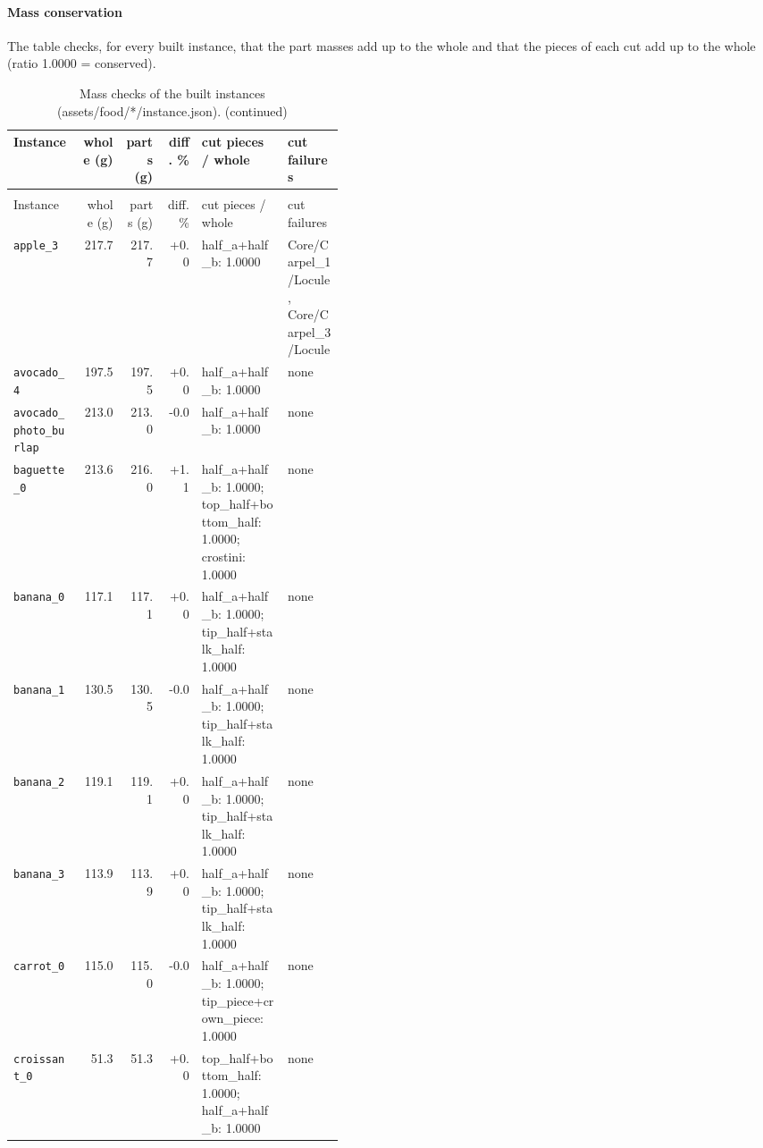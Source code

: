 \documentclass[10.5pt,a4paper]{article}
\begin{document}
\paragraph{Mass conservation} The table checks, for every built instance, that the part masses add up to the
whole and that the pieces of each cut add up to the whole (ratio 1.0000 = conserved).
{\scriptsize\begin{longtable}{@{}lrrrp{0.26\linewidth}p{0.17\linewidth}@{}}\caption{Mass checks of the built instances (assets/food/*/instance.json).\label{tab:mass}}\\\toprule Instance & whole (g) & parts (g) & diff. \% & cut pieces / whole & cut failures \\\midrule\endfirsthead
\caption[]{Mass checks of the built instances (assets/food/*/instance.json). (continued)}\\\toprule Instance & whole (g) & parts (g) & diff. \% & cut pieces / whole & cut failures \\\midrule\endhead
\texttt{apple\_\allowbreak{}3} & 217.7 & 217.7 & +0.0 & half\_a+half\_b: 1.0000 & Core/Carpel\_1/Locule, Core/Carpel\_3/Locule \\
\texttt{avocado\_\allowbreak{}4} & 197.5 & 197.5 & +0.0 & half\_a+half\_b: 1.0000 & none \\
\texttt{avocado\_\allowbreak{}photo\_\allowbreak{}burlap} & 213.0 & 213.0 & -0.0 & half\_a+half\_b: 1.0000 & none \\
\texttt{baguette\_\allowbreak{}0} & 213.6 & 216.0 & +1.1 & half\_a+half\_b: 1.0000; top\_half+bottom\_half: 1.0000; crostini: 1.0000 & none \\
\texttt{banana\_\allowbreak{}0} & 117.1 & 117.1 & +0.0 & half\_a+half\_b: 1.0000; tip\_half+stalk\_half: 1.0000 & none \\
\texttt{banana\_\allowbreak{}1} & 130.5 & 130.5 & -0.0 & half\_a+half\_b: 1.0000; tip\_half+stalk\_half: 1.0000 & none \\
\texttt{banana\_\allowbreak{}2} & 119.1 & 119.1 & +0.0 & half\_a+half\_b: 1.0000; tip\_half+stalk\_half: 1.0000 & none \\
\texttt{banana\_\allowbreak{}3} & 113.9 & 113.9 & +0.0 & half\_a+half\_b: 1.0000; tip\_half+stalk\_half: 1.0000 & none \\
\texttt{carrot\_\allowbreak{}0} & 115.0 & 115.0 & -0.0 & half\_a+half\_b: 1.0000; tip\_piece+crown\_piece: 1.0000 & none \\
\texttt{croissant\_\allowbreak{}0} & 51.3 & 51.3 & +0.0 & top\_half+bottom\_half: 1.0000; half\_a+half\_b: 1.0000 & none \\

\end{longtable}}
\end{document}
